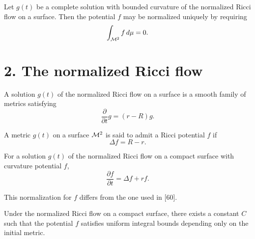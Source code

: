 \begin{lemma}
\label{ch05-lem-potential-normalization}
Let \(g(t)\) be a complete solution with bounded curvature of the normalized Ricci flow on a surface. Then the potential \(f\) may be normalized uniquely by requiring
\[
\int_{\mathcal{M}^2} f\,d\mu = 0.
\]
\end{lemma}

\section*{2. The normalized Ricci flow}

\begin{definition}
\label{ch05-def-normalized-flow}
A solution \(g(t)\) of the normalized Ricci flow on a surface is a smooth family of metrics satisfying
\[
\frac{\partial}{\partial t}g=(r-R)g.
\]
\end{definition}

\begin{definition}
\label{ch05-def-ricci-potential}
A metric \(g(t)\) on a surface \(\mathcal{M}^2\) is said to admit a Ricci potential \(f\) if
\[
\Delta f=R-r.
\]
\end{definition}

\begin{lemma}
\label{ch05-lem-potential-equation}
For a solution \(g(t)\) of the normalized Ricci flow on a compact surface with curvature potential \(f\),
\[
\frac{\partial f}{\partial t}=\Delta f + r f.
\]
\end{lemma}

\begin{remark}
\label{ch05-rem-potential-normalization}
This normalization for \(f\) differs from the one used in [60].
\end{remark}

\begin{corollary}
\label{ch05-cor-potential-time-evolution}
Under the normalized Ricci flow on a compact surface, there exists a constant \(C\) such that the potential \(f\) satisfies uniform integral bounds depending only on the initial metric.
\end{corollary}


